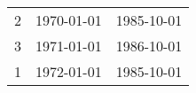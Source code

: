 % 
\begin{tabular}{ccc}
  \hline
  \hline
2 & 1970-01-01 & 1985-10-01 \\ 
  3 & 1971-01-01 & 1986-10-01 \\ 
  1 & 1972-01-01 & 1985-10-01 \\ 
   \hline
\end{tabular}

